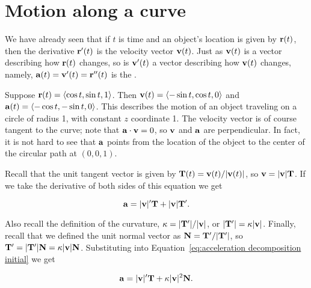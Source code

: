 \section{Motion along a curve}\label{sec:MotionAlongCurve}

We have already seen that if $t$ is time and an object's location is
given by ${\bf r}(t)$, then the derivative ${\bf r}'(t)$ is the
velocity vector ${\bf v}(t)$.
Just as ${\bf v}(t)$ is a vector describing how ${\bf r}(t)$ changes,
so is ${\bf v}'(t)$ a vector describing how ${\bf v}(t)$ changes,
namely, ${\bf a}(t)={\bf v}'(t)={\bf r}''(t)$ is the 
.

\begin{example}{}{}
Suppose ${\bf r}(t)=\langle \cos t,\sin t,1\rangle$. Then
${\bf v}(t)=\langle -\sin t,\cos t,0\rangle$ and 
${\bf a}(t)=\langle -\cos t,-\sin t,0\rangle$. This describes the
motion of an object traveling on a circle of radius 1, with constant
$z$ coordinate 1. The velocity vector is of course tangent to the
curve; note that ${\bf a}\cdot{\bf v}=0$, so ${\bf v}$ and ${\bf a}$
are perpendicular. In fact, it is not hard to see that ${\bf a}$
points from the location of the object to the center of the circular
path at $(0,0,1)$.
\end{example}

Recall that the unit tangent vector is given by ${\bf T}(t)=
{\bf v}(t)/|{\bf v}(t)|$, so ${\bf v}=|{\bf v}|{\bf T}$. If we take
the derivative of both sides of this equation we get

\begin{equation}\label{eq:acceleration decomposition initial}
{\bf a}=|{\bf v}|'{\bf T}+|{\bf v}|{\bf T}'.
\end{equation}

Also recall the definition of the curvature,
$\kappa=|{\bf T}'|/|{\bf v}|$, or $|{\bf T}'|=\kappa|{\bf v}|$. Finally,
    recall that we defined the unit normal vector as
${\bf N}={\bf T}'/|{\bf T}'|$, so ${\bf T}'=|{\bf T}'|{\bf N}=
\kappa|{\bf v}|{\bf N}$.
Substituting into Equation~\ref{eq:acceleration decomposition initial} we get

\begin{equation}\label{eq:acceleration decomposition final}
{\bf a}=|{\bf v}|'{\bf T}+\kappa|{\bf v}|^2{\bf N}.
\end{equation}

